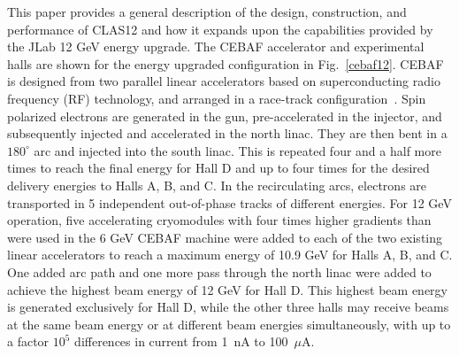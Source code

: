 \documentclass[final,3p,twocolumn]{elsarticle}
\begin{document}
 This paper provides a general description of the design, construction, and performance of CLAS12 and how it expands upon the capabilities provided by the JLab 12 GeV energy upgrade.   
The CEBAF accelerator and experimental halls are shown for the energy upgraded configuration in Fig.~\ref{cebaf12}. CEBAF is designed from 
two parallel linear accelerators based on superconducting radio frequency (RF) technology, and arranged in a race-track configuration~\cite{Leemann:2001dg}.
 Spin polarized electrons are generated in the gun,  
pre-accelerated in the injector, and subsequently injected and accelerated in the north linac. They are then bent in a $180^\circ$ arc and injected 
into the south linac. This is repeated four and a half more times to reach the final energy for Hall D and 
up to four times  for the desired delivery energies to Halls A, B, and C. In the recirculating arcs, electrons are transported in 5 
independent out-of-phase tracks of different energies. For 12 GeV operation, five accelerating cryomodules 
with four times higher gradients than were used in the 6 GeV CEBAF machine were added to each of the two 
existing linear accelerators to reach a maximum energy of 10.9 GeV for Halls A, B, and C. One added arc path and one 
more pass through the north linac were added to achieve the highest beam energy of 12 GeV for Hall D. 
This highest beam energy is generated exclusively for Hall D, while the other three halls may receive 
beams at the same beam energy or at different beam energies simultaneously, with up to a factor $10^5$ 
differences in current from 1~nA to 100~$\mu$A.
\end{document}
